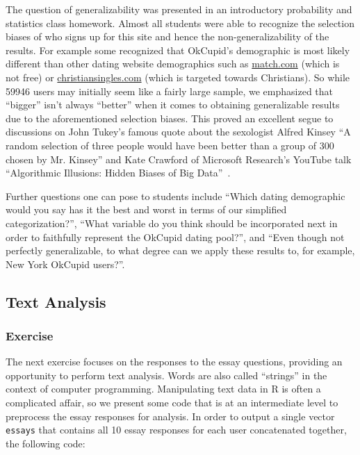 \documentclass{article}\usepackage[]{graphicx}\usepackage[]{color}
\begin{document}
The question of generalizability was presented in an introductory probability and statistics class homework.  Almost all students were able to recognize the selection biases of who signs up for this site and hence the non-generalizability of the results.  For example some recognized that OkCupid's demographic is most likely different than other dating website demographics such as \url{match.com} (which is not free) or \url{christiansingles.com} (which is targeted towards Christians).  So while 59946 users may initially seem like a fairly large sample, we emphasized that ``bigger'' isn't always ``better'' when it comes to obtaining generalizable results due to the aforementioned selection biases.  This proved an excellent segue to discussions on John Tukey's famous quote about the sexologist Alfred Kinsey ``A random selection of three people would have been better than a group of 300 chosen by Mr. Kinsey'' and Kate Crawford of Microsoft Research's YouTube talk ``Algorithmic Illusions: Hidden Biases of Big Data''~\cite{Strata}.

Further questions one can pose to students include ``Which dating demographic would you say has it the best and worst in terms of our simplified categorization?'', ``What variable do you think should be incorporated next in order to faithfully represent the OkCupid dating pool?'',  and ``Even though not perfectly generalizable, to what degree can we apply these results to, for example, New York OkCupid users?''.







\subsection{Text Analysis}\label{essays}
\subsubsection{Exercise}
The next exercise focuses on the responses to the essay questions, providing an opportunity to perform text analysis.  Words are also called ``strings'' in the context of computer programming.  Manipulating text data in R is often a complicated affair, so we present some code that is at an intermediate level to preprocess the essay responses for analysis.  In order to output a single vector \verb#essays# that contains all 10 essay responses for each user concatenated together, the following code:
\end{document}
